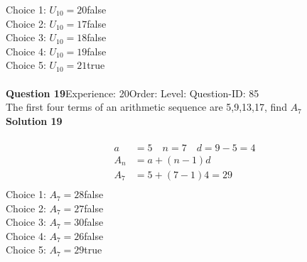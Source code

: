 \documentclass{article}
\begin{document}
Choice 1: \hspace{20pt}$U_{10}=20$\hspace{20pt}false\\
Choice 2: \hspace{20pt}$U_{10}=17$\hspace{20pt}false\\
Choice 3: \hspace{20pt}$U_{10}=18$\hspace{20pt}false\\
Choice 4: \hspace{20pt}$U_{10}=19$\hspace{20pt}false\\
Choice 5: \hspace{20pt}$U_{10}=21$\hspace{20pt}true\\
\\[4pt]
\noindent\textbf{Question 19}\hspace{20pt}Experience: 20\hspace{20pt}Order: \hspace{20pt}Level: \hspace{20pt}Question-ID: 85\\[2pt]
The first four terms of an arithmetic sequence are 5,9,13,17, find $A_7$\\[4pt]
\noindent\textbf{Solution 19}\\[2pt]
\\[-35pt]\begin{align*}
a&=5 \quad n=7 \quad d=9-5=4\\[2pt]
A_n&=a+(n-1)d\\[2pt]
A_7&=5+(7-1)4=29\\[2pt]
\end{align*}
Choice 1: \hspace{20pt}$A_7=28$\hspace{20pt}false\\
Choice 2: \hspace{20pt}$A_7=27$\hspace{20pt}false\\
Choice 3: \hspace{20pt}$A_7=30$\hspace{20pt}false\\
Choice 4: \hspace{20pt}$A_7=26$\hspace{20pt}false\\
Choice 5: \hspace{20pt}$A_7=29$\hspace{20pt}true\\
\end{document}
